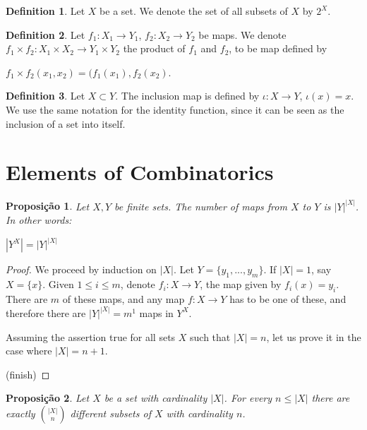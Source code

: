 \documentclass[]{article}
\newtheorem{proposition}{Proposição}[section]
\theoremstyle{definition}
\newtheorem{definition}{Definition}[section]
\theoremstyle{definition}
\newcommand{\raw}{\rightarrow}
\begin{document}
	\begin{definition}
		Let $X$ be a set. We denote the set of all subsets of $X$ by $2^X$.
	\end{definition}
	
	\begin{definition}
		Let $f_1:X_1 \raw Y_1$, $f_2:X_2 \raw Y_2$ be maps. We denote $f_1 \times f_2: X_1 \times X_2 \raw Y_1 \times Y_2$ the product of $f_1$ and $f_2$, to be map defined by 
		
		\begin{center}
			$f_1 \times f_2(x_1, x_2) = (f_1(x_1), f_2(x_2)$.
		\end{center}
	\end{definition}
	
	\begin{definition}
		Let $X \subset Y$. The inclusion map is defined by $\iota: X \raw Y$, $\iota(x)=x$. We use the same notation for the identity function, since it can be seen as the inclusion of a set into itself.
	\end{definition}
	
	
	\section{Elements of Combinatorics}
	
	\begin{proposition}
		
		Let $X, Y$ be finite sets. The number of maps from $X$ to $Y$ is $|Y|^{|X|}$. In other words:
		
		\begin{center}
			$|Y^X| = |Y|^{|X|}$
		\end{center}
		
	\end{proposition}
	
	\begin{proof}
		We proceed by induction on $|X|$. Let $Y=\{y_1, ..., y_m \}$. If $|X| = 1$, say $X = \{x\}$. Given $1 \leq i \leq m$, denote $f_i:X \raw Y$, the map given by $f_i(x)=y_i$. There are $m$ of these maps, and any map $f:X \raw Y$ has to be one of these, and therefore there are $|Y|^{|X|} = m^1$ maps in $Y^X$.
		
		Assuming the assertion true for all sets $X$ such that $|X|=n$, let us prove it in the case where $|X|= n+1$.	
		
		(finish)
	\end{proof}
	
	\begin{proposition}
		Let $X$ be a set with cardinality $|X|$. For every $n\leq|X|$ there are exactly $\binom{|X|}{n}$ different subsets of $X$ with cardinality $n$.
	\end{proposition}
	
\end{document}
